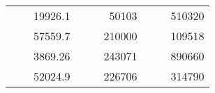 \begin{table}[H]
\begin{tabular}{|ccrccrccc}
\rowcolor[HTML]{DDFDFF} 
\multicolumn{1}{|c|}{\cellcolor[HTML]{FFFFC7}}                                & \multicolumn{1}{c|}{\cellcolor[HTML]{DDFDFF}}                      & \multicolumn{1}{r|}{\cellcolor[HTML]{DAE8FC}19926.1}   & \multicolumn{1}{c|}{\cellcolor[HTML]{FFFFC7}}                                & \multicolumn{1}{c|}{\cellcolor[HTML]{DDFDFF}}                       & \multicolumn{1}{r|}{\cellcolor[HTML]{DDFDFF}50103}     & \multicolumn{1}{c|}{\cellcolor[HTML]{FFFFC7}}                                & \multicolumn{1}{c|}{\cellcolor[HTML]{DDFDFF}}                      & \multicolumn{1}{r|}{\cellcolor[HTML]{DDFDFF}510320}    \\ \cline{3-3} \cline{6-6} \cline{9-9} 
\multicolumn{1}{|c|}{\cellcolor[HTML]{FFFFC7}}                                & \multicolumn{1}{c|}{\cellcolor[HTML]{DDFDFF}}                      & \multicolumn{1}{r|}{\cellcolor[HTML]{DDFDFF}57559.7}   & \multicolumn{1}{c|}{\cellcolor[HTML]{FFFFC7}}                                & \multicolumn{1}{c|}{\cellcolor[HTML]{DDFDFF}}                       & \multicolumn{1}{r|}{\cellcolor[HTML]{DAE8FC}210000}    & \multicolumn{1}{c|}{\cellcolor[HTML]{FFFFC7}}                                & \multicolumn{1}{c|}{\cellcolor[HTML]{DDFDFF}}                      & \multicolumn{1}{r|}{\cellcolor[HTML]{DAE8FC}109518}    \\ \cline{3-3} \cline{6-6} \cline{9-9} 
\rowcolor[HTML]{DDFDFF} 
\multicolumn{1}{|c|}{\cellcolor[HTML]{FFFFC7}}                                & \multicolumn{1}{c|}{\cellcolor[HTML]{DDFDFF}}                      & \multicolumn{1}{r|}{\cellcolor[HTML]{DAE8FC}3869.26}   & \multicolumn{1}{c|}{\cellcolor[HTML]{FFFFC7}}                                & \multicolumn{1}{c|}{\cellcolor[HTML]{DDFDFF}}                       & \multicolumn{1}{r|}{\cellcolor[HTML]{DDFDFF}243071}    & \multicolumn{1}{c|}{\cellcolor[HTML]{FFFFC7}}                                & \multicolumn{1}{c|}{\cellcolor[HTML]{DDFDFF}}                      & \multicolumn{1}{r|}{\cellcolor[HTML]{DDFDFF}890660}    \\ \cline{3-3} \cline{6-6} \cline{9-9} 
\multicolumn{1}{|c|}{\cellcolor[HTML]{FFFFC7}}                                & \multicolumn{1}{c|}{\cellcolor[HTML]{DDFDFF}}                      & \multicolumn{1}{r|}{\cellcolor[HTML]{DDFDFF}52024.9}   & \multicolumn{1}{c|}{\cellcolor[HTML]{FFFFC7}}                                & \multicolumn{1}{c|}{\cellcolor[HTML]{DDFDFF}}                       & \multicolumn{1}{r|}{\cellcolor[HTML]{DAE8FC}226706}    & \multicolumn{1}{c|}{\cellcolor[HTML]{FFFFC7}}                                & \multicolumn{1}{c|}{\cellcolor[HTML]{DDFDFF}}                      & \multicolumn{1}{r|}{\cellcolor[HTML]{DAE8FC}314790}    \\ \cline{3-3} \cline{6-6} \cline{9-9} 

\end{tabular}
\end{table}
